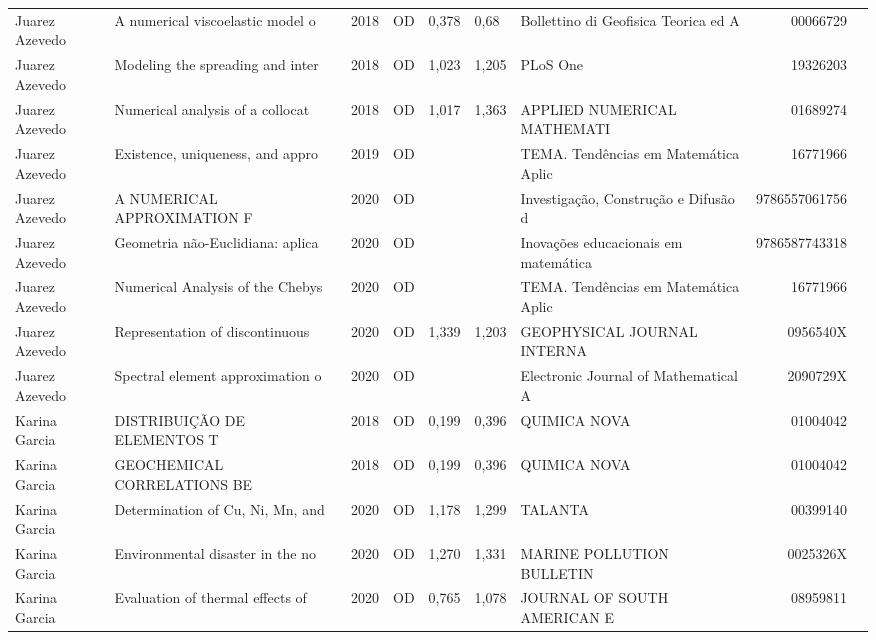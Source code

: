 \documentclass[12pt,brazil]{article}\usepackage[]{graphicx}\usepackage[]{xcolor}
\begin{document}
\begin{longtable}{lllrrllrr}
Juarez Azevedo & A numerical viscoelastic model o & 2018 & OD & 0,378 & 0,68 & Bollettino di Geofisica Teorica ed A & 00066729 \\
Juarez Azevedo & Modeling the spreading and inter & 2018 & OD & 1,023 & 1,205 & PLoS One & 19326203 \\
Juarez Azevedo & Numerical analysis of a collocat & 2018 & OD & 1,017 & 1,363 & APPLIED NUMERICAL MATHEMATI & 01689274 \\
Juarez Azevedo & Existence, uniqueness, and appro & 2019 & OD &  &  & TEMA. Tendências em Matemática Aplic & 16771966 \\
Juarez Azevedo & A NUMERICAL APPROXIMATION F & 2020 & OD &  &  & Investigação, Construção e Difusão d & 9786557061756 \\
Juarez Azevedo & Geometria não-Euclidiana: aplica & 2020 & OD &  &  & Inovações educacionais em matemática & 9786587743318 \\
Juarez Azevedo & Numerical Analysis of the Chebys & 2020 & OD &  &  & TEMA. Tendências em Matemática Aplic & 16771966 \\
Juarez Azevedo & Representation of discontinuous  & 2020 & OD & 1,339 & 1,203 & GEOPHYSICAL JOURNAL INTERNA & 0956540X \\
Juarez Azevedo & Spectral element approximation o & 2020 & OD &  &  & Electronic Journal of Mathematical A & 2090729X \\
\rowcolor{coautr}\rowcolor{coautr}\rowcolor{coautr}\rowcolor{coautr}\rowcolor{coautr}\rowcolor{coautr}\rowcolor{coautr}\rowcolor{coautr}\rowcolor{coautr}\rowcolor{coautr}\rowcolor{coautr}\rowcolor{coautr}\rowcolor{coautr}\rowcolor{coautr}\rowcolor{coautr}\rowcolor{coautr}Karina Garcia & DISTRIBUIÇÃO DE ELEMENTOS T & 2018 & OD & 0,199 & 0,396 & QUIMICA NOVA & 01004042 \\
Karina Garcia & GEOCHEMICAL CORRELATIONS BE & 2018 & OD & 0,199 & 0,396 & QUIMICA NOVA & 01004042 \\
Karina Garcia & Determination of Cu, Ni, Mn, and & 2020 & OD & 1,178 & 1,299 & TALANTA & 00399140 \\
\rowcolor{coautr}\rowcolor{coautr}\rowcolor{coautr}\rowcolor{coautr}\rowcolor{coautr}\rowcolor{coautr}\rowcolor{coautr}\rowcolor{coautr}\rowcolor{coautr}\rowcolor{coautr}\rowcolor{coautr}\rowcolor{coautr}\rowcolor{coautr}\rowcolor{coautr}\rowcolor{coautr}\rowcolor{coautr}Karina Garcia & Environmental disaster in the no & 2020 & OD & 1,270 & 1,331 & MARINE POLLUTION BULLETIN & 0025326X \\
\rowcolor{coautr}\rowcolor{coautr}\rowcolor{coautr}\rowcolor{coautr}\rowcolor{coautr}\rowcolor{coautr}\rowcolor{coautr}\rowcolor{coautr}\rowcolor{coautr}\rowcolor{coautr}\rowcolor{coautr}\rowcolor{coautr}\rowcolor{coautr}\rowcolor{coautr}\rowcolor{coautr}\rowcolor{coautr}Karina Garcia & Evaluation of thermal effects of & 2020 & OD & 0,765 & 1,078 & JOURNAL OF SOUTH AMERICAN E & 08959811 \\

\end{longtable}
\end{document}
